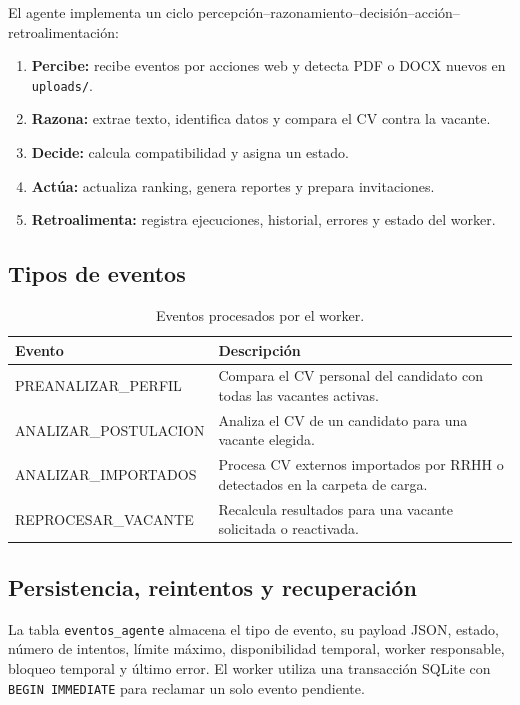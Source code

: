 \documentclass[12pt,a4paper]{article}
\begin{document}
El agente implementa un ciclo percepción--razonamiento--decisión--acción--retroalimentación:

\begin{enumerate}[leftmargin=*]
    \item \textbf{Percibe:} recibe eventos por acciones web y detecta PDF o DOCX nuevos en \texttt{uploads/}.
    \item \textbf{Razona:} extrae texto, identifica datos y compara el CV contra la vacante.
    \item \textbf{Decide:} calcula compatibilidad y asigna un estado.
    \item \textbf{Actúa:} actualiza ranking, genera reportes y prepara invitaciones.
    \item \textbf{Retroalimenta:} registra ejecuciones, historial, errores y estado del worker.
\end{enumerate}

\subsection{Tipos de eventos}

\begin{table}[ht]
\centering
\begin{tabularx}{\textwidth}{>{\ttfamily}p{4.2cm}X}
\toprule
\textbf{Evento} & \textbf{Descripción} \\
\midrule
PREANALIZAR\_PERFIL & Compara el CV personal del candidato con todas las vacantes activas. \\
ANALIZAR\_POSTULACION & Analiza el CV de un candidato para una vacante elegida. \\
ANALIZAR\_IMPORTADOS & Procesa CV externos importados por RRHH o detectados en la carpeta de carga. \\
REPROCESAR\_VACANTE & Recalcula resultados para una vacante solicitada o reactivada. \\
\bottomrule
\end{tabularx}
\caption{Eventos procesados por el worker.}
\end{table}

\subsection{Persistencia, reintentos y recuperación}

La tabla \texttt{eventos\_agente} almacena el tipo de evento, su payload JSON, estado, número de intentos, límite máximo, disponibilidad temporal, worker responsable, bloqueo temporal y último error. El worker utiliza una transacción SQLite con \texttt{BEGIN IMMEDIATE} para reclamar un solo evento pendiente.
\end{document}
